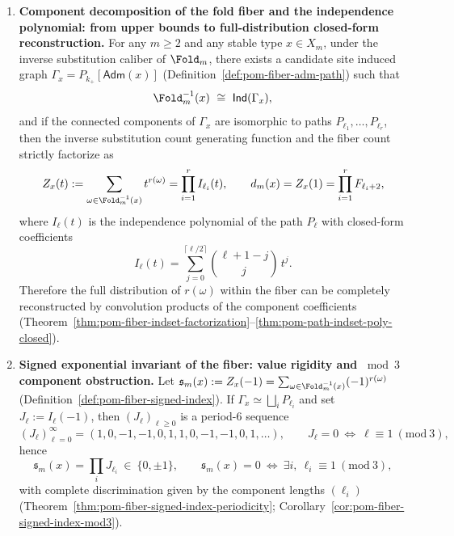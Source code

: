 \begin{theorem}
\begin{enumerate}
  \item \textbf{Component decomposition of the fold fiber and the independence polynomial: from upper bounds to full-distribution closed-form reconstruction.}
  For any \(m\ge 2\) and any stable type \(x\in X_m\), under the inverse substitution caliber of \(\Fold_m\), there exists a candidate site induced graph \(\Gamma_x=P_{k_+}[\mathsf{Adm}(x)]\) (Definition~\ref{def:pom-fiber-adm-path}) such that
  \[
  \Fold_m^{-1}(x)\ \cong\ \mathsf{Ind}(\Gamma_x),
  \]
  and if the connected components of \(\Gamma_x\) are isomorphic to paths \(P_{\ell_1},\dots,P_{\ell_r}\), then the inverse substitution count generating function and the fiber count strictly factorize as
  \[
  Z_x(t):=\sum_{\omega\in\Fold_m^{-1}(x)}t^{r(\omega)}
  =\prod_{i=1}^r I_{\ell_i}(t),
  \qquad
  d_m(x)=Z_x(1)=\prod_{i=1}^r F_{\ell_i+2},
  \]
  where \(I_{\ell}(t)\) is the independence polynomial of the path \(P_\ell\) with closed-form coefficients
  \[
  I_{\ell}(t)=\sum_{j=0}^{\lceil \ell/2\rceil}\binom{\ell+1-j}{j}\,t^j.
  \]
  Therefore the full distribution of \(r(\omega)\) within the fiber can be completely reconstructed by convolution products of the component coefficients (Theorem~\ref{thm:pom-fiber-indset-factorization}--\ref{thm:pom-path-indset-poly-closed}).

  \item \textbf{Signed exponential invariant of the fiber: value rigidity and \texorpdfstring{$\bmod 3$}{mod 3} component obstruction.}
  Let \(\mathfrak{s}_m(x):=Z_x(-1)=\sum_{\omega\in\Fold_m^{-1}(x)}(-1)^{r(\omega)}\) (Definition~\ref{def:pom-fiber-signed-index}).
  If \(\Gamma_x\simeq\bigsqcup_i P_{\ell_i}\) and set \(J_\ell:=I_\ell(-1)\), then \((J_\ell)_{\ell\ge 0}\) is a period-\(6\) sequence
  \[
  (J_\ell)_{\ell=0}^{\infty}=(1,0,-1,-1,0,1,1,0,-1,-1,0,1,\dots),
  \qquad
  J_\ell=0\ \Longleftrightarrow\ \ell\equiv 1\ (\mathrm{mod}\ 3),
  \]
  hence
  \[
  \mathfrak{s}_m(x)=\prod_i J_{\ell_i}\ \in\ \{0,\pm 1\},
  \qquad
  \mathfrak{s}_m(x)=0\ \Longleftrightarrow\ \exists i,\ \ell_i\equiv 1\ (\mathrm{mod}\ 3),
  \]
  with complete discrimination given by the component lengths \((\ell_i)\) (Theorem~\ref{thm:pom-fiber-signed-index-periodicity}; Corollary~\ref{cor:pom-fiber-signed-index-mod3}).


\end{enumerate}
\end{theorem}
